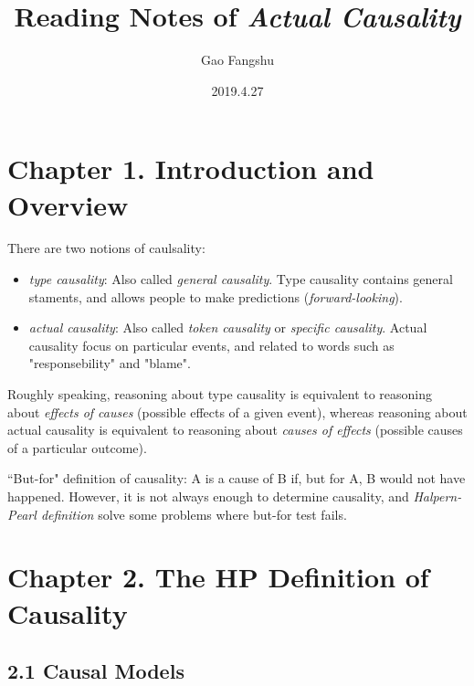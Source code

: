\documentclass[UTF8]{ctexbook}
\title{Reading Notes of \textit{Actual Causality}}
\author{Gao Fangshu}
\date{2019.4.27}
\begin{document}
\maketitle
\section*{Chapter 1. Introduction and Overview}
There are two notions of caulsality:
\begin{itemize}
\item \textit{type causality}: Also called \textit{general causality}. Type causality contains general staments, and allows people to make predictions (\textit{forward-looking}). 
\item \textit{actual causality}: Also called \textit{token causality} or \textit{specific causality}. Actual causality focus on particular events, and related to words such as "responsebility" and "blame".
\end{itemize}

Roughly speaking, reasoning about type causality is equivalent to reasoning about \textit{effects of causes} (possible effects of a given event), whereas reasoning about actual causality is equivalent to reasoning about \textit{causes of effects} (possible causes of a particular outcome).

``But-for" definition of causality: A is a cause of B if, but for A, B would not have happened. However, it is not always enough to determine causality, and \textit{Halpern-Pearl definition} solve some problems where but-for test fails.

\section*{Chapter 2. The HP Definition of Causality}
\subsection*{2.1 Causal Models}
\end{document}
